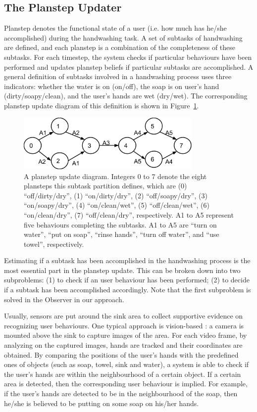 \subsection{The Planstep Updater}

Planstep denotes the functional state of a user (i.e. how much has he/she accomplished) during the handwashing task. A set of subtasks of handwashing are defined, and each planstep is a combination of the completeness of these subtasks. For each timestep, the system checks if particular behaviours have been performed and updates planstep beliefs if particular subtasks are accomplished. A general definition of subtasks involved in a handwashing process uses three indicators: whether the water is on (on/off), the soap is on user's hand (dirty/soapy/clean), and the user's hands are wet (dry/wet). The corresponding planstep update diagram of this definition is shown in Figure~\ref{fig:planstep}.

\begin{figure}[h!]
\centering
\includegraphics[width=0.8\textwidth]{fig/planstep.png}
\caption{A planstep update diagram. Integers 0 to 7 denote the eight plansteps this subtask partition defines, which are (0) ``off/dirty/dry'', (1) ``on/dirty/dry'', (2) ``off/soapy/dry'', (3) ``on/soapy/dry'', (4) ``on/clean/wet'', (5) ``off/clean/wet'', (6) ``on/clean/dry'', (7) ``off/clean/dry'', respectively. A1 to A5 represent five behaviours completing the subtasks. A1 to A5 are ``turn on water'', ``put on soap'', ``rinse hands'', ``turn off water'', and ``use towel'', respectively.}
\label{fig:planstep}
\end{figure}

Estimating if a subtask has been accomplished in the handwashing process is the most essential part in the planstep update. This can be broken down into two subproblems: (1) to check if an user behaviour has been performed; (2) to decide if a subtask has been accomplished accordingly. Note that the first subproblem is solved in the Observer in our approach.

Usually, sensors are put around the sink area to collect supportive evidence on recognizing user behaviours. One typical approach is vision-based \cite{hoey2006tracking, mihailidis2004use, czarnuch2014}: a camera is mounted above the sink to capture images of the area. For each video frame, by analyzing on the captured images, hands are tracked and their coordinates are obtained. By comparing the positions of the user's hands with the predefined ones of objects (such as soap, towel, sink and water), a system is able to check if the user's hands are within the neighbourhood of a certain object. If a certain area is detected, then the corresponding user behaviour is implied. For example, if the user's hands are detected to be in the neighbourhood of the soap, then he/she is believed to be putting on some soap on his/her hands. 

